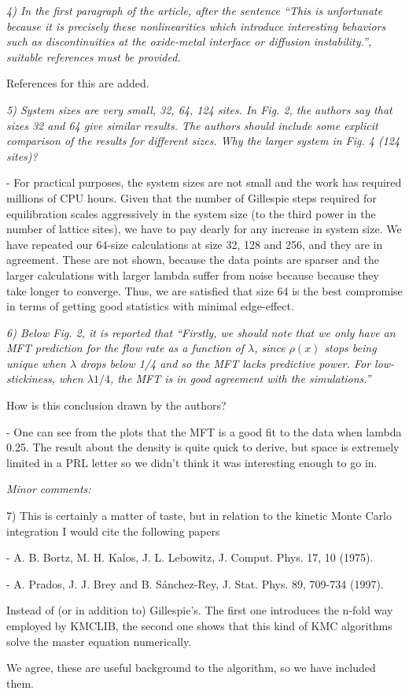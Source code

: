 \documentclass[a4paper,10pt]{article}
\begin{document}
{\it    4) In the first paragraph of the article, after the sentence ``This is
   unfortunate because it is precisely these nonlinearities which
   introduce interesting behaviors such as discontinuities at the
   oxide-metal interface or diffusion instability.'', suitable references
   must be provided.}
  
   References for this are added.
  
{\it   5) System sizes are very small, 32, 64, 124 sites. In Fig. 2, the
   authors say that sizes 32 and 64 give similar results. The authors
   should include some explicit comparison of the results for different
   sizes. Why the larger system in Fig. 4 (124 sites)?}
  
   - For practical purposes, the system sizes are not small and the
   work has required millions of CPU hours. Given that the number of
   Gillespie steps required for equilibration scales aggressively in
   the system size (to the third power in the number of lattice
   sites), we have to pay dearly for any increase in system size. We
   have repeated our 64-size calculations at size 32,
   128 and 256, and they are in agreement.  These are not shown, because the data points are sparser and the 
larger calculations with
   larger lambda suffer from noise because because they take longer to converge. 
Thus, we are
   satisfied that size 64 is the best compromise in terms of getting
   good statistics with minimal edge-effect. 

  
{\it    6) Below Fig. 2, it is reported that ``Firstly, we should note that we
   only have an MFT prediction for the flow rate as a function of
   $\lambda$, since $\rho(x)$ stops being unique when $\lambda$ drops
   below 1/4 and so the MFT lacks predictive power. For low-stickiness,
   when $\lambda 1/4$, the MFT is in good agreement with the
   simulations.''
  
   How is this conclusion drawn by the authors?}
  
   - One can see from the plots that the MFT is a good fit to the data
   when lambda 0.25. The result about the density is quite quick to
   derive, but space is extremely limited in a PRL letter so we didn’t
   think it was interesting enough to go in.
  

{\it 
   Minor comments:
  
   7) This is certainly a matter of taste, but in relation to the kinetic
   Monte Carlo integration I would cite the following papers
  
   - A. B. Bortz, M. H. Kalos, J. L. Lebowitz, J. Comput. Phys. 17, 10
   (1975).
  
   - A. Prados, J. J. Brey and B. Sánchez-Rey, J. Stat. Phys. 89, 709-734
   (1997).
  
   Instead of (or in addition to) Gillespie's. The first one introduces
   the n-fold way employed by KMCLIB, the second one shows that this kind
   of KMC algorithms solve the master equation numerically.
  }
   We agree, these are useful background to the algorithm, so we have included them.
  
\end{document}
